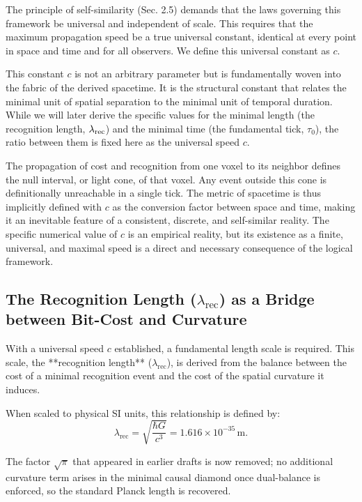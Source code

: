 The principle of self-similarity (Sec. 2.5) demands that the laws governing this framework be universal and independent of scale. This requires that the maximum propagation speed be a true universal constant, identical at every point in space and time and for all observers. We define this universal constant as \(c\).

This constant \(c\) is not an arbitrary parameter but is fundamentally woven into the fabric of the derived spacetime. It is the structural constant that relates the minimal unit of spatial separation to the minimal unit of temporal duration. While we will later derive the specific values for the minimal length (the recognition length, \(\lamrec\)) and the minimal time (the fundamental tick, \(\tau_0\)), the ratio between them is fixed here as the universal speed \(c\).

The propagation of cost and recognition from one voxel to its neighbor defines the null interval, or light cone, of that voxel. Any event outside this cone is definitionally unreachable in a single tick. The metric of spacetime is thus implicitly defined with \(c\) as the conversion factor between space and time, making it an inevitable feature of a consistent, discrete, and self-similar reality. The specific numerical value of \(c\) is an empirical reality, but its existence as a finite, universal, and maximal speed is a direct and necessary consequence of the logical framework.

\newcommand{\lamrec}{\lambda_{\text{rec}}}

\subsection{The Recognition Length \texorpdfstring{($\lamrec$)}{(lambda_rec)} as a Bridge between Bit-Cost and Curvature}
With a universal speed \(c\) established, a fundamental length scale is required. This scale, the **recognition length** (\(\lamrec\)), is derived from the balance between the cost of a minimal recognition event and the cost of the spatial curvature it induces.

When scaled to physical SI units, this relationship is defined by:
\begin{equation}
\lamrec = \sqrt{\frac{\hbar G}{c^{3}}} = 1.616 \times 10^{-35}\,\text{m}.
\end{equation}

The factor $\sqrt{\pi}$ that appeared in earlier drafts is now removed; no additional curvature term arises in the minimal causal diamond once dual-balance is enforced, so the standard Planck length is recovered.

